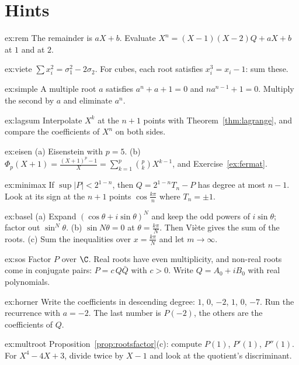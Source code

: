 \section{Hints}

\begin{hint}{ex:rem}
The remainder is $aX+b$. Evaluate $X^n=(X-1)(X-2)Q+aX+b$ at $1$ and at $2$.
\end{hint}
\begin{hint}{ex:viete}
$\sum x_i^2=\sigma_1^2-2\sigma_2$. For cubes, each root satisfies $x_i^3=x_i-1$: sum these.
\end{hint}
\begin{hint}{ex:simple}
A multiple root $a$ satisfies $a^n+a+1=0$ and $na^{n-1}+1=0$. Multiply the second by $a$ and eliminate $a^n$.
\end{hint}
\begin{hint}{ex:lagsum}
Interpolate $X^k$ at the $n+1$ points with Theorem~\ref{thm:lagrange}, and compare the coefficients of $X^n$ on both sides.
\end{hint}
\begin{hint}{ex:eisen}
(a) Eisenstein with $p=5$. (b) $\Phi_p(X+1)=\frac{(X+1)^p-1}X=\sum_{k=1}^p\binom pkX^{k-1}$, and Exercise~\ref{ex:fermat}.
\end{hint}
\begin{hint}{ex:minimax}
If $\sup|P|<2^{1-n}$, then $Q=2^{1-n}T_n-P$ has degree at most $n-1$. Look at its sign at the $n+1$ points $\cos\frac{k\pi}n$ where $T_n=\pm1$.
\end{hint}
\begin{hint}{ex:basel}
(a) Expand $(\cos\theta+i\sin\theta)^N$ and keep the odd powers of $i\sin\theta$; factor out $\sin^N\theta$. (b) $\sin N\theta=0$ at $\theta=\frac{k\pi}N$. Then Vi\`ete gives the sum of the roots. (c) Sum the inequalities over $x=\frac{k\pi}N$ and let $m\to\infty$.
\end{hint}
\begin{hint}{ex:sos}
Factor $P$ over $\C$. Real roots have even multiplicity, and non-real roots come in conjugate pairs: $P=c\,Q\bar Q$ with $c>0$. Write $Q=A_0+iB_0$ with real polynomials.
\end{hint}
\begin{hint}{ex:horner}
Write the coefficients in descending degree: $1$, $0$, $-2$, $1$, $0$, $-7$. Run the recurrence with $a=-2$. The last number is $P(-2)$, the others are the coefficients of $Q$.
\end{hint}
\begin{hint}{ex:multroot}
Proposition~\ref{prop:rootsfactor}(c): compute $P(1)$, $P'(1)$, $P''(1)$. For $X^4-4X+3$, divide twice by $X-1$ and look at the quotient's discriminant.
\end{hint}
